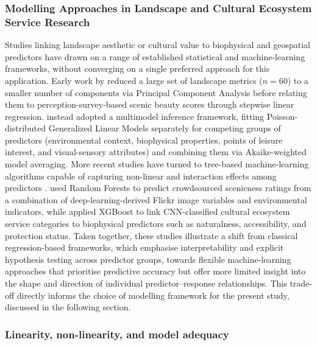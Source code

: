 \documentclass[hidelinks, 11pt]{article}
\begin{document}
\subsubsection{Modelling Approaches in Landscape and Cultural Ecosystem Service Research}

Studies linking landscape aesthetic or cultural value to biophysical and geospatial predictors have drawn on a range of established statistical and machine-learning frameworks, without converging on a single preferred approach for this application. Early work by \citet{schirpke_predicting_2013} reduced a large set of landscape metrics ($n = 60$) to a smaller number of components via Principal Component Analysis before relating them to perception-survey-based scenic beauty scores through stepwise linear regression. \citet{vaz_digital_2020} instead adopted a multimodel inference framework, fitting Poisson-distributed Generalized Linear Models separately for competing groups of predictors (environmental context, biophysical properties, points of leisure interest, and visual-sensory attributes) and combining them via Akaike-weighted model averaging. More recent studies have turned to tree-based machine-learning algorithms capable of capturing non-linear and interaction effects among predictors \citep{comalada_modelling_2025,havinga_social_2021}. \citet{havinga_social_2021} used Random Forests to predict crowdsourced scenicness ratings from a combination of deep-learning-derived Flickr image variables and environmental indicators, while \citet{comalada_modelling_2025} applied XGBoost to link CNN-classified cultural ecosystem service categories to biophysical predictors such as naturalness, accessibility, and protection status. Taken together, these studies illustrate a shift from classical regression-based frameworks, which emphasise interpretability and explicit hypothesis testing across predictor groups, towards flexible machine-learning approaches that prioritise predictive accuracy but offer more limited insight into the shape and direction of individual predictor--response relationships. This trade-off directly informs the choice of modelling framework for the present study, discussed in the following section.

\subsubsection{Linearity, non-linearity, and model adequacy}
\end{document}
